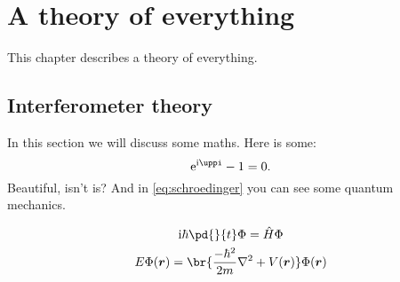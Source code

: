 \cleardoublepage
\chapter{A theory of everything}\label{ch:theory}
This chapter describes a theory of everything.
\section{Interferometer theory}\label{s:inttheory}
In this section we will discuss some maths. Here is some:
\begin{equation}
   \e^{\i\pi} - 1 = 0\text{.}
\end{equation}
Beautiful, isn't is? And in \cref{eq:schroedinger} you can see some quantum mechanics.

\begin{subequations}\label{eq:schroedinger}
   \begin{gather}
      \i \hbar \pd{}{t}\Phi = \op{H}\Phi\\
      E\Phi(\vec{r}) = \br{\frac{-\hbar^2}{2m} \nabla^2 + V(\vec{r}) } \Phi(\vec{r})
   \end{gather}
\end{subequations}

